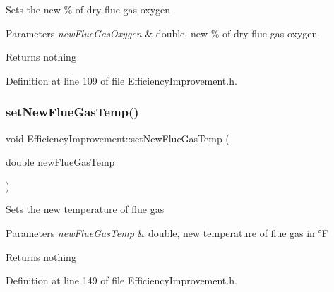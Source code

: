 Sets the new \% of dry flue gas oxygen


\begin{DoxyParams}{Parameters}
{\em new\+Flue\+Gas\+Oxygen} & double, new \% of dry flue gas oxygen\\
\hline
\end{DoxyParams}
\begin{DoxyReturn}{Returns}
nothing 
\end{DoxyReturn}


Definition at line 109 of file Efficiency\+Improvement.\+h.

\mbox{\label{class_efficiency_improvement_ab88d3976fca8f55bb1fd3278bc427fc1}} 
\subsubsection{\texorpdfstring{set\+New\+Flue\+Gas\+Temp()}{setNewFlueGasTemp()}\hspace{0.1cm}{\footnotesize\ttfamily [1/3]}}
{\footnotesize\ttfamily void Efficiency\+Improvement\+::set\+New\+Flue\+Gas\+Temp (\begin{DoxyParamCaption}\item[{double}]{new\+Flue\+Gas\+Temp }\end{DoxyParamCaption})\hspace{0.3cm}{\ttfamily [inline]}}

Sets the new temperature of flue gas


\begin{DoxyParams}{Parameters}
{\em new\+Flue\+Gas\+Temp} & double, new temperature of flue gas in °F\\
\hline
\end{DoxyParams}
\begin{DoxyReturn}{Returns}
nothing 
\end{DoxyReturn}


Definition at line 149 of file Efficiency\+Improvement.\+h.

\mbox{\label{class_efficiency_improvement_ab88d3976fca8f55bb1fd3278bc427fc1}} 
